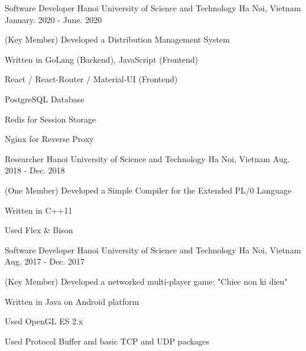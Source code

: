 \begin{cventries}

\cventry
{Software Developer} %
{Hanoi University of Science and Technology} %
{Ha Noi, Vietnam} %
{January. 2020 - June. 2020} %
{ %
\begin{cvitems}
\item{(Key Member) Developed a Distribution Management System}
\item{Written in GoLang (Backend), JavaScript (Frontend)}
\item{React / React-Router / Material-UI (Frontend)}
\item{PostgreSQL Database}
\item{Redis for Session Storage}
\item{Nginx for Reverse Proxy}
\end{cvitems}
}


\cventry
{Researcher} %
{Hanoi University of Science and Technology} %
{Ha Noi, Vietnam} %
{Aug. 2018 - Dec. 2018} %
{ %
\begin{cvitems}
\item{(One Member) Developed a Simple Compiler for the Extended PL/0 Language}
\item{Written in C++11}
\item{Used Flex \& Bison}
\end{cvitems}
}


\cventry
{Software Developer} %
{Hanoi University of Science and Technology} %
{Ha Noi, Vietnam} %
{Aug. 2017 - Dec. 2017} %
{ %
\begin{cvitems}
\item{(Key Member) Developed a networked multi-player game: "Chiec non ki dieu"}
\item{Written in Java on Android platform}
\item{Used OpenGL ES 2.x}
\item{Used Protocol Buffer and basic TCP and UDP packages}
\end{cvitems}
}


\end{cventries}
